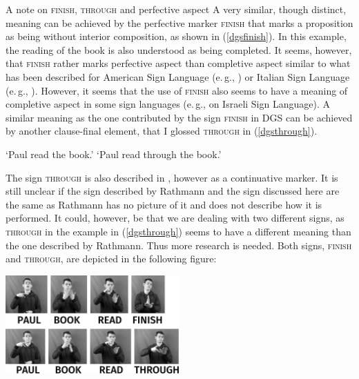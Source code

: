 \begin{digression}{{A note on \textsc{finish}, \textsc{through} and perfective aspect}}{}
\noindent A very similar, though distinct, meaning can be achieved by the perfective marker \textsc{finish} that marks a proposition as being without interior composition, as shown in (\ref{dgsfinish}). In this example, the reading of the book is also understood as being completed. It seems, however, that \textsc{finish} rather marks perfective aspect than completive aspect similar to what has been described for American Sign Language (e.\,g., \citealt{aarons1992clausal}) or Italian Sign Language (e.\,g., \citealt{zucchi2003}). However, it seems that the use of \textsc{finish} also seems to have a meaning of completive aspect in some sign languages (e.\,g., \citealt{meir1999aperfect} on Israeli Sign Language). A similar meaning as the one contributed by the sign \textsc{finish} in DGS can be achieved by another clause-final element, that I glossed \textsc{through} in (\ref{dgsthrough}).


\begin{exe}
\ex\label{ex:perfectivea}\begin{xlist}
\glt `Paul read the book.' \label{dgsfinish}
\glt `Paul read through the book.' \label{dgsthrough}
\end{xlist}
\end{exe}

\noindent The sign \textsc{through} is also described in \citet[259]{rathmann2005event}, however as a continuative marker. It is still unclear if the sign described by Rathmann and the sign discussed here are the same as Rathmann has no picture of it and does not describe how it is performed. It could, however, be that we are dealing with two different signs, as \textsc{through} in the example in (\ref{dgsthrough}) seems to have a different meaning than the one described by Rathmann. Thus more research is needed. Both signs, \textsc{finish} and \textsc{through}, are depicted in the following figure: \\

\begin{center}
	\includegraphics[width=0.5\textwidth]{fertigunddurchsw.jpg}
	\end{center}
\vspace{0.2cm}


\end{digression}
